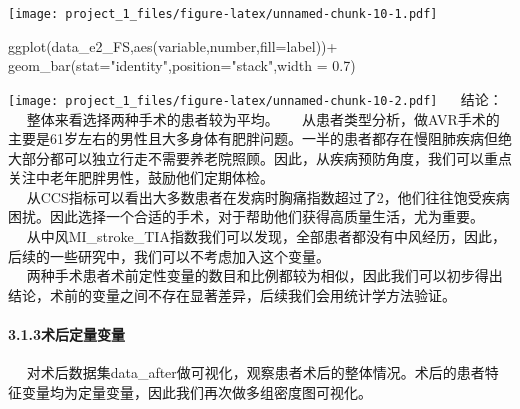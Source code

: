 \documentclass[
]{article}
\newenvironment{Shaded}{\begin{snugshade}}{\end{snugshade}}
\newcommand{\AttributeTok}[1]{\textcolor[rgb]{0.77,0.63,0.00}{#1}}
\newcommand{\FloatTok}[1]{\textcolor[rgb]{0.00,0.00,0.81}{#1}}
\newcommand{\FunctionTok}[1]{\textcolor[rgb]{0.00,0.00,0.00}{#1}}
\newcommand{\NormalTok}[1]{#1}
\newcommand{\SpecialCharTok}[1]{\textcolor[rgb]{0.00,0.00,0.00}{#1}}
\newcommand{\StringTok}[1]{\textcolor[rgb]{0.31,0.60,0.02}{#1}}
\begin{document}
\texttt{[image: project\_1\_files/figure-latex/unnamed-chunk-10-1.pdf]}

\begin{Shaded}
\begin{Highlighting}[]
\FunctionTok{ggplot}\NormalTok{(data\_e2\_FS,}\FunctionTok{aes}\NormalTok{(variable,number,}\AttributeTok{fill=}\NormalTok{label))}\SpecialCharTok{+}
  \FunctionTok{geom\_bar}\NormalTok{(}\AttributeTok{stat=}\StringTok{"identity"}\NormalTok{,}\AttributeTok{position=}\StringTok{"stack"}\NormalTok{,}\AttributeTok{width =} \FloatTok{0.7}\NormalTok{)}
\end{Highlighting}
\end{Shaded}

\texttt{[image: project\_1\_files/figure-latex/unnamed-chunk-10-2.pdf]}  
结论：   整体来看选择两种手术的患者较为平均。  
从患者类型分析，做AVR手术的主要是61岁左右的男性且大多身体有肥胖问题。一半的患者都存在慢阻肺疾病但绝大部分都可以独立行走不需要养老院照顾。因此，从疾病预防角度，我们可以重点关注中老年肥胖男性，鼓励他们定期体检。\\
 
从CCS指标可以看出大多数患者在发病时胸痛指数超过了2，他们往往饱受疾病困扰。因此选择一个合适的手术，对于帮助他们获得高质量生活，尤为重要。\\
 
从中风MI\_stroke\_TIA指数我们可以发现，全部患者都没有中风经历，因此，后续的一些研究中，我们可以不考虑加入这个变量。\\
 
两种手术患者术前定性变量的数目和比例都较为相似，因此我们可以初步得出结论，术前的变量之间不存在显著差异，后续我们会用统计学方法验证。

\hypertarget{ux672fux540eux5b9aux91cfux53d8ux91cf}{%
\paragraph{3.1.3术后定量变量}\label{ux672fux540eux5b9aux91cfux53d8ux91cf}}

 
对术后数据集data\_after做可视化，观察患者术后的整体情况。术后的患者特征变量均为定量变量，因此我们再次做多组密度图可视化。
\end{document}
